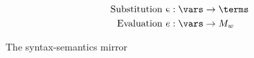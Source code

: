 
\begin{marginfigure}
  \begin{align*}
    \text{Substitution } &\hvrefl{e} : \vars \to \terms \\
    \text{Evaluation } &e : \vars \to M_w
  \end{align*}
  \caption{The syntax-semantics mirror}
\end{marginfigure}

